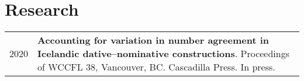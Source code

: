 \documentclass[11pt,a4paper]{article}
\begin{document}
  \section{Research}
  \begin{longtable}{p{2cm}|p{14.5cm}}
    \textsc{2020}&%
    \textbf{Accounting for variation in number agreement in Icelandic
    dative--nominative constructions}.
    Proceedings of WCCFL 38, Vancouver, BC. Cascadilla Press. In press.\\
  \end{longtable}




\end{document}
